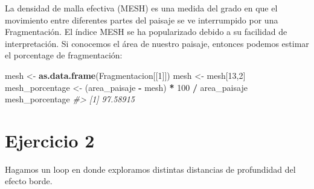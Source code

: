 \documentclass[
]{book}
\newenvironment{Shaded}{\begin{snugshade}}{\end{snugshade}}
\newcommand{\CommentTok}[1]{\textcolor[rgb]{0.56,0.35,0.01}{\textit{#1}}}
\newcommand{\DecValTok}[1]{\textcolor[rgb]{0.00,0.00,0.81}{#1}}
\newcommand{\FunctionTok}[1]{\textcolor[rgb]{0.13,0.29,0.53}{\textbf{#1}}}
\newcommand{\NormalTok}[1]{#1}
\newcommand{\OtherTok}[1]{\textcolor[rgb]{0.56,0.35,0.01}{#1}}
\newcommand{\SpecialCharTok}[1]{\textcolor[rgb]{0.81,0.36,0.00}{\textbf{#1}}}
\begin{document}
La densidad de malla efectiva (MESH) es una medida del grado en que el movimiento entre diferentes partes del paisaje se ve interrumpido por una Fragmentación. El índice MESH se ha popularizado debido a su facilidad de interpretación. Si conocemos el área de nuestro paisaje, entonces podemos estimar el porcentage de fragmentación:

\begin{Shaded}
\begin{Highlighting}[]
\NormalTok{mesh }\OtherTok{\textless{}{-}} \FunctionTok{as.data.frame}\NormalTok{(Fragmentacion[[}\DecValTok{1}\NormalTok{]])}
\NormalTok{mesh }\OtherTok{\textless{}{-}}\NormalTok{ mesh[}\DecValTok{13}\NormalTok{,}\DecValTok{2}\NormalTok{]}
\NormalTok{mesh\_porcentage }\OtherTok{\textless{}{-}}\NormalTok{  (area\_paisaje }\SpecialCharTok{{-}}\NormalTok{ mesh) }\SpecialCharTok{*} \DecValTok{100} \SpecialCharTok{/}\NormalTok{ area\_paisaje }
\NormalTok{mesh\_porcentage}
\CommentTok{\#\textgreater{} [1] 97.58915}
\end{Highlighting}
\end{Shaded}

\section{Ejercicio 2}\label{ejercicio-2}

Hagamos un loop en donde exploramos distintas distancias de profundidad del efecto borde.
\end{document}
